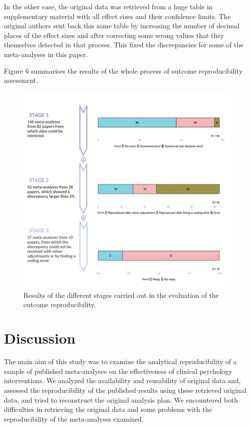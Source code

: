 \documentclass[
  ,apa7,floatsintext]{apa6}
\begin{document}
In the other case, the original data was retrieved from a huge table in supplementary material with all effect sizes and their confidence limits. The original authors sent back this same table by increasing the number of decimal places of the effect sizes and after correcting some wrong values that they themselves detected in that process. This fixed the discrepancies for some of the meta-analyses in this paper.

Figure 6 summarises the results of the whole process of outcome reproducibility assessment.

\begin{figure}
\begin{center}
\includegraphics[width=\textwidth]{results/Figure 6.png}

\caption{Results of the different stages carried out in the evaluation of the outcome reproducibility. 
}

\label{fig:fig6}
\end{center}
\end{figure}

\hypertarget{discussion}{%
\section{Discussion}\label{discussion}}

The main aim of this study was to examine the analytical reproducibility of a sample of published meta-analyses on the effectiveness of clinical psychology interventions. We analyzed the availability and reusability of original data and, assessed the reproducibility of the published results using these retrieved original data, and tried to reconstruct the original analysis plan. We encountered both difficulties in retrieving the original data and some problems with the reproducibility of the meta-analyses examined.
\end{document}
